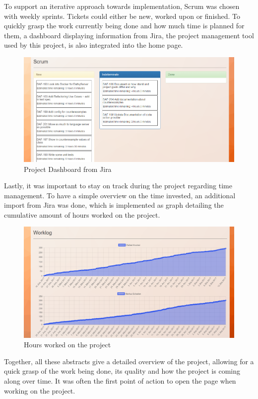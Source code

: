 To support an iterative approach towards implementation, Scrum was chosen with weekly sprints. Tickets could either be new, worked upon or finished. To quickly grasp the work currently being done and how much time is planned for them, a dashboard displaying information from Jira, the project management tool used by this project, is also integrated into the home page.\newline
\begin{figure}[H]
	\centering
	\includegraphics[width=1\textwidth]{img/homeScrum}
	\caption{Project Dashboard from Jira}
	\label{fig:Jira}
\end{figure}
Lastly, it was important to stay on track during the project regarding time management. To have a simple overview on the time invested, an additional import from Jira was done, which is implemented as graph detailing the cumulative amount of hours worked on the project. \newline
\begin{figure}[H]
	\centering
	\includegraphics[width=1\textwidth]{img/homeTime}
	\caption{Hours worked on the project}
	\label{fig:Jira Hours}
\end{figure}
Together, all these abstracts give a detailed overview of the project, allowing for a quick grasp of the work being done, its quality and how the project is coming along over time. It was often the first point of action to open the page when working on the project. 
